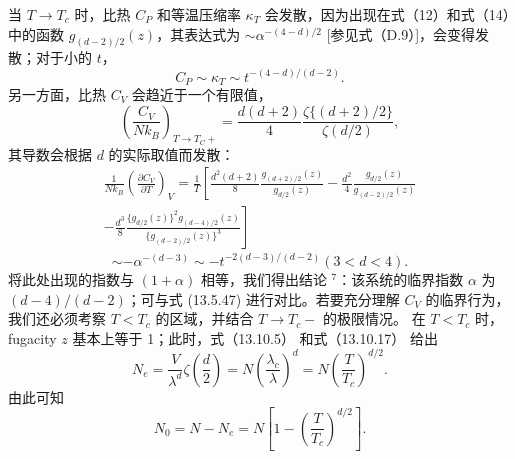 当 \(T \to T_{c}\) 时，比热 \(C_{P}\) 和等温压缩率 \(\kappa_{T}\) 会发散，因为出现在式（12）和式（14）中的函数 \(g_{(d-2)/2}(z)\)，其表达式为 \(\sim \alpha^{-(4-d)/2}\) {[}参见式（D.9）{]}，会变得发散；对于小的 \(t\)，
\begin{equation}\tag{13.6.28}\label{eq:13.6.28}
C _ { P } \sim \kappa _ { T } \sim t ^{- ( 4 - d ) / ( d - 2 )} .
\end{equation}
另一方面，比热 \(C_{V}\) 会趋近于一个有限值，
\begin{equation}\tag{13.6.29}\label{eq:13.6.29}
\left( \frac { C _ { V } } { N k _ { B } } \right) _ { T \rightarrow T _ { C } + } = \frac { d ( d + 2 ) } { 4 } \frac { \zeta \{ ( d + 2 ) / 2 \} } { \zeta ( d / 2 ) } ,
\end{equation}
其导数会根据 \(d\) 的实际取值而发散：
\begin{equation}\tag{13.6.30}\label{eq:13.6.30}
\begin{array}{r} { \frac { 1 } { N k _ { B } } \left( \frac { \partial C _ { V } } { \partial T } \right) _ { V } = \frac { 1 } { T } \left[ \frac { d ^{2} ( d + 2 ) } { 8 } \frac { g _ { ( d + 2 ) / 2 } ( z ) } { g _ { d / 2 } ( z ) } - \frac { d ^{2} } { 4 } \frac { g _ { d / 2 } ( z ) } { g _ { ( d - 2 ) / 2 } ( z ) } \right. } \\{ \left. - \frac { d ^{3} } { 8 } \frac { \{ g _ { d / 2 } ( z ) \} ^{2} g _ { ( d - 4 ) / 2 } ( z ) } { \{ g _ { ( d - 2 ) / 2 } ( z ) \} ^{3} } \right] } \end{array}
\end{equation}
\begin{equation}\tag{13.6.31}\label{eq:13.6.31}
\sim - \alpha ^{- ( d - 3 )} \sim - t ^{- 2 ( d - 3 ) / ( d - 2 )}  ( 3 < d < 4 ) .
\end{equation}
将此处出现的指数与 \((1+\alpha)\) 相等，我们得出结论 \(^{7}\)：该系统的临界指数 \(\alpha\) 为 \((d-4)/(d-2)\)；可与式 (13.5.47) 进行对比。若要充分理解 \(C_{V}\) 的临界行为，我们还必须考察 \(T<T_{c}\) 的区域，并结合 \(T\rightarrow T_{c}-\) 的极限情况。
在 \(T < T_{c}\) 时， fugacity \(z\) 基本上等于 1；此时，式（13.10.5） 和式（13.10.17） 给出
\begin{equation}\tag{13.6.32}\label{eq:13.6.32}
N _ { e } = \frac { V } { \lambda ^{d} } \zeta \left( \frac { d } { 2 } \right) = N \left( \frac { \lambda _ { c } } { \lambda } \right) ^{d} = N \left( \frac { T } { T _ { c } } \right) ^{d / 2} .
\end{equation}
由此可知
\begin{equation}\tag{13.6.33}\label{eq:13.6.33}
N _ { 0 } = N - N _ { e } = N \left[ 1 - \left( \frac { T } { T _ { c } } \right) ^{d / 2} \right] .
\end{equation}

